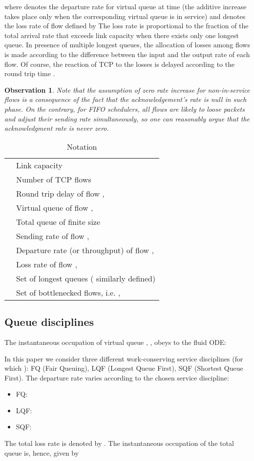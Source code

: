 \documentclass[a4paper,oneside, 11pt]{article}
\newtheorem{obs}[theorem]{Observation}
\begin{document}
where
  denotes the departure rate for virtual queue  at time  (the additive increase takes place only when the
corresponding virtual queue is in service) and
 denotes the loss rate of flow  defined by
The loss rate is proportional to the fraction of the total arrival rate  that
exceeds link capacity when there exists only one longest queue. In presence of multiple longest queues, the allocation of losses among flows is made according to the difference between the input and the output rate of each flow.
Of course, the reaction of TCP to the losses is delayed according to the round trip time .\begin{obs}
Note that the assumption of zero rate increase for non-in-service flows is a consequence of the fact that the acknowledgement's rate is null in such phase. On the contrary, for FIFO schedulers, all flows are likely to loose packets and adjust their sending rate simultaneously, so  one can reasonably argue that the acknowledgment rate is never zero.
\end{obs}
\begin{table}[tb]
\begin{footnotesize}
\centering
\begin{tabular}{|l|l|}
\hline
  & Link capacity   \\
  & Number of TCP flows  \\
  & Round trip delay of flow ,  \\
  & Virtual queue of flow ,  \\
  & Total queue of finite size  \\
  & Sending rate of flow , \\
  & Departure rate (or throughput) of flow , \\
  & Loss rate of flow , \\
  & Set of longest queues ( similarly defined)\\
   & Set of bottlenecked flows, i.e. ,  \\
\hline
\end{tabular}
\caption{Notation}\label{tab:notation}
\end{footnotesize}
\end{table}
\subsection{Queue disciplines}\label{subsec:queues}
The instantaneous occupation of virtual queue , , obeys to the fluid ODE:

In this paper we consider three different work-conserving service disciplines (for which ):
FQ (Fair Queuing), LQF (Longest Queue First), SQF (Shortest Queue First).
The departure rate  varies according to the chosen service discipline:
\begin{itemize}
\item FQ:
\item LQF: 
\item SQF:
\end{itemize}
The total loss rate is denoted by .	
The instantaneous occupation of the total queue  is, hence, given by
\end{document}
